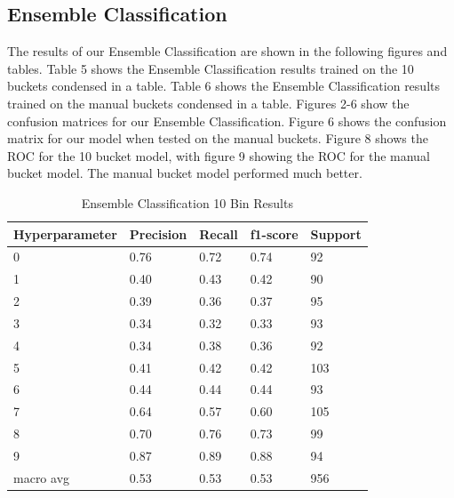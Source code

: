 \documentclass{article}
\begin{document}
\subsection{Ensemble Classification}
The results of our Ensemble Classification are shown in the following figures and tables.
\newline
\newline
Table 5 shows the Ensemble Classification results trained on the 10 buckets condensed in a table. Table 6 shows the Ensemble Classification results trained on the manual buckets condensed in a table.
\newline
\newline
Figures 2-6 show the confusion matrices for our Ensemble Classification. Figure 6 shows the confusion matrix for our model when tested on the manual buckets. Figure 8 shows the ROC for the 10 bucket model, with figure 9 showing the ROC for the manual bucket model. The manual bucket model performed much better.



\begin{table}[h]
\centering
\caption{Ensemble Classification 10 Bin Results}
\vspace{3pt}
\label{tab:hyperparameters}
\begin{tabular}{|l|l|l|l|l|}
\hline
\textbf{Hyperparameter} & \textbf{Precision} & \textbf{Recall} & \textbf{f1-score} & \textbf{Support} \\


\hline
0 & 0.76 & 0.72 & 0.74 & 92 \\
\hline
1  & 0.40 & 0.43 & 0.42 & 90 \\
\hline
2 & 0.39 & 0.36 & 0.37 & 95 \\
\hline
3  & 0.34 & 0.32 & 0.33 & 93 \\
\hline
4 & 0.34 & 0.38 & 0.36 & 92 \\
\hline
5 & 0.41 & 0.42 & 0.42 & 103 \\
\hline
6 & 0.44 & 0.44 & 0.44 & 93 \\
\hline
7 & 0.64 & 0.57 & 0.60 & 105 \\
\hline
8  & 0.70 & 0.76 & 0.73 & 99 \\
\hline
9 & 0.87 & 0.89 & 0.88 & 94 \\
\hline
macro avg & 0.53 & 0.53 & 0.53 & 956 \\
\hline
\end{tabular}
\end{table}
\end{document}
